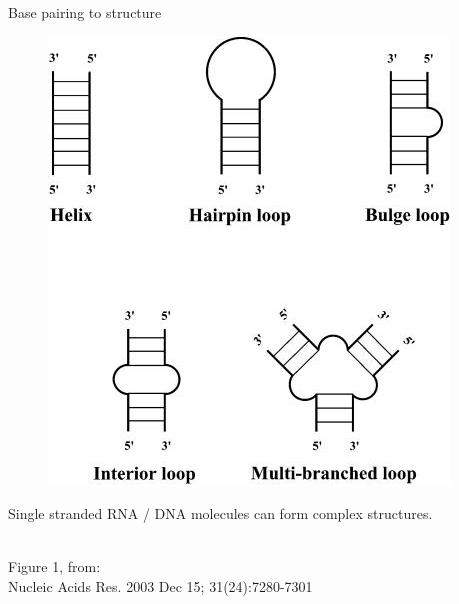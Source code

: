 \documentclass[pdf]{beamer}
\begin{document}
\begin{frame}{Base pairing to structure}
  \begin{figure}[ht]
    \includegraphics[height=0.7\textheight]{images/oligonucleotide_structures}
  \end{figure}
  \small
  Single stranded RNA / DNA molecules can form complex structures.
  {\tiny
  \\
  Figure 1, from:\\
  Nucleic Acids Res. 2003 Dec 15; 31(24):7280-7301
  \par
  }
\end{frame}
\end{document}
